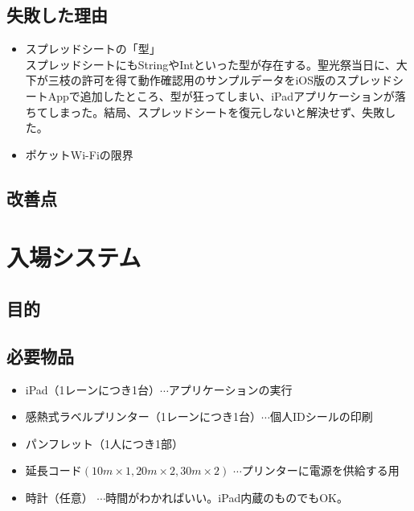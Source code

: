 \documentclass[dvipdfmx,jb5]{jarticle}
\begin{document}
\subsection{失敗した理由}
 \begin{itemize}
  \item スプレッドシートの「型」\\
  スプレッドシートにもStringやIntといった型が存在する。聖光祭当日に、大下が三枝の許可を得て動作確認用のサンプルデータをiOS版のスプレッドシートAppで追加したところ、型が狂ってしまい、iPadアプリケーションが落ちてしまった。結局、スプレッドシートを復元しないと解決せず、失敗した。
  \item ポケットWi-Fiの限界\\


 \end{itemize}
\subsection{改善点}
\section{入場システム}
\subsection{目的}
\subsection{必要物品}
 \begin{itemize}
 \item iPad（1レーンにつき1台）$\cdots$アプリケーションの実行
 \item 感熱式ラベルプリンター（1レーンにつき1台）$\cdots$個人IDシールの印刷
 \item パンフレット（1人につき1部）
 \item 延長コード$(10m\times1,20m\times2,30m\times2)$ $\cdots$プリンターに電源を供給する用
 \item 時計（任意） $\cdots$時間がわかればいい。iPad内蔵のものでもOK。
 \end{itemize}
\end{document}
